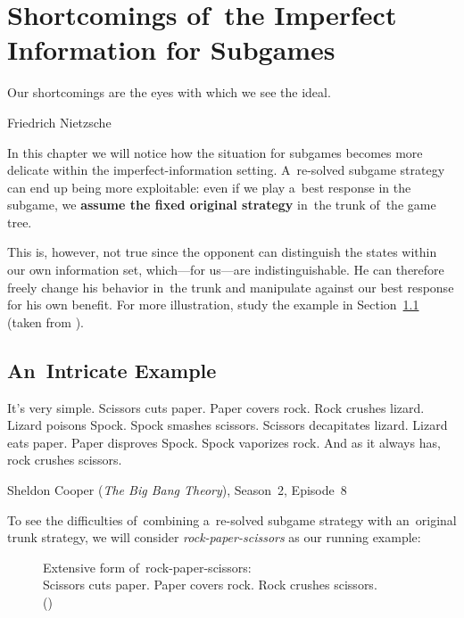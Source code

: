 \chapter{Shortcomings of~the Imperfect Information for Subgames}
{
  \setlength{\epigraphwidth}{0.75\textwidth}
  \epigraph{
    Our shortcomings are the eyes with which we see the ideal.
  }{Friedrich Nietzsche}
}%
In this chapter we will notice how the situation for subgames becomes more delicate within the imperfect-information setting.
A~re-solved subgame strategy can end up being more exploitable:
even if we play a~best response in the subgame, we \textbf{assume the fixed original strategy} in~the trunk of~the game tree.

This is, however, not true since the opponent can distinguish the states within our own information set, which---for us---are indistinguishable.
He can therefore freely change his behavior in~the trunk and manipulate against our best response for his own benefit.
For more illustration, study the example in Section~\ref{sec:intricate-ex} (taken from \cite{BurchJohansonBowling13}).

\section{An~Intricate Example}
\label{sec:intricate-ex}
{
  \setlength{\epigraphwidth}{0.75\textwidth}
  \epigraph{
    It's very simple.
    Scissors cuts paper.
    Paper covers rock.
    Rock crushes lizard.
    Lizard poisons Spock.
    Spock smashes scissors.
    Scissors decapitates lizard.
    Lizard eats paper.
    Paper disproves Spock.
    Spock vaporizes rock.
    And as it always has, rock crushes scissors.
  }{Sheldon Cooper (\emph{The Big Bang Theory}), Season~2, Episode~8}
}%
To see the difficulties of~combining a~re-solved subgame strategy with an~original trunk strategy, we will consider \emph{rock-paper-scissors}\footnotemark{} as our running example:
\begin{figure}[H]
  \centering
  \scriptsize
  \def\svgwidth{.45\textwidth}
  
  \def\captionTitle{Extensive form of~rock-paper-scissors}
  \caption[\captionTitle]{\captionTitle:\\ Scissors cuts paper. Paper covers rock. Rock crushes scissors. \\(\cite{BurchJohansonBowling13})}
  \label{fig:game-tree-rock-paper-scissors}
\end{figure}

